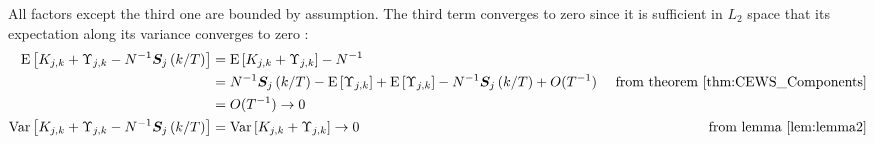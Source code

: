 \documentclass[main_document.tex]{subfiles}
\begin{document}
All factors except the third one are bounded by assumption. The third term converges to zero since it is sufficient in $L_2$ space that its expectation along its variance converges to zero :
\begin{align*}
	\mathrm{E}\left[K_{j,k} + \Upsilon_{j,k} - N^{-1}\bm{S}_{j}\left(k/T\right)\right] &= \mathrm{E}\left[K_{j,k} + \Upsilon_{j,k}\right] - N^{-1} \\
											   &= N^{-1} \bm{S}_{j}\left(k/T\right) - \mathrm{E}\left[\Upsilon_{j,k}\right] + \mathrm{E}\left[\Upsilon_{j,k}\right] - N^{-1} \bm{S}_{j}\left(k/T\right) + O(T^{-1}) &\text{ from theorem }\ref{thm:CEWS_Components}
\\ &= O(T^{-1}) \to 0 \\
	\mathrm{Var}\left[K_{j,k} + \Upsilon_{j,k} - N^{-1}\bm{S}_{j}\left(k/T\right)\right] &= \mathrm{Var}\left[K_{j,k} + \Upsilon_{j,k}\right] \to 0 & \text{ from lemma } \ref{lem:lemma2}
\end{align*}
\end{document}
